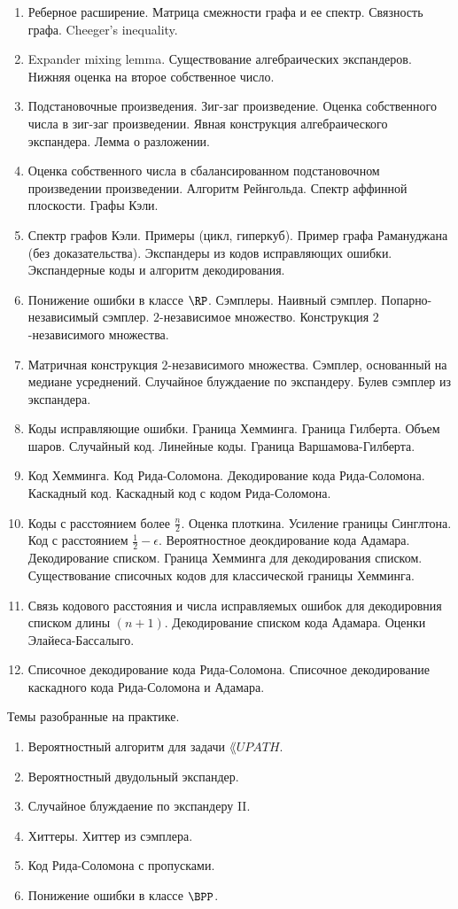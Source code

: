 \begin{enumerate}
    \item Реберное расширение. Матрица смежности графа и ее спектр. Связность графа. Cheeger's inequality.
    \item Expander mixing lemma. Существование алгебраических экспандеров. Нижняя оценка на второе собственное число.
    \item Подстановочные произведения. Зиг-заг произведение. Оценка собственного числа в зиг-заг произведении. Явная
        конструкция алгебраического экспандера. Лемма о разложении. 
    \item Оценка собственного числа в сбалансированном подстановочном произведении произведении. Алгоритм Рейнгольда. Спектр
        аффинной плоскости. Графы Кэли.
    \item Спектр графов Кэли. Примеры (цикл, гиперкуб). Пример графа Рамануджана (без доказательства). Экспандеры из кодов
        исправляющих ошибки. Экспандерные коды и алгоритм декодирования.
    \item Понижение ошибки в классе $\RP$. Сэмплеры. Наивный сэмплер. Попарно-независимый сэмплер. $2$-независимое
        множество. Конструкция $2$-независимого множества.
    \item Матричная конструкция $2$-независимого множества. Сэмплер, основанный на медиане усреднений. Случайное блуждаение
        по экспандеру. Булев сэмплер из экспандера.
    \item Коды исправляющие ошибки. Граница Хемминга. Граница Гилберта. Объем шаров. Случайный код. Линейные коды. Граница
        Варшамова-Гилберта.
    \item Код Хемминга. Код Рида-Соломона. Декодирование кода Рида-Соломона. Каскадный код. Каскадный код с кодом
        Рида-Соломона.
    \item Коды с расстоянием более $\frac{n}{2}$. Оценка плоткина. Усиление границы Синглтона. Код с расстоянием $\frac{1}{2}
        - \epsilon$. Вероятностное деокдирование кода Адамара. Декодирование списком. Граница Хемминга для декодирования
        списком. Существование списочных кодов для классической границы Хемминга.
	\item Связь кодового расстояния и числа исправляемых ошибок для декодировния списком длины $(n + 1)$. Декодирование
        списком кода Адамара. Оценки Элайеса-Бассалыго.
    \item Списочное декодирование кода Рида-Соломона. Списочное декодирование каскадного кода Рида-Соломона и Адамара.
\end{enumerate}

\breakline

Темы разобранные на практике.
\begin{enumerate}
    \item Вероятностный алгоритм для задачи $\lang{UPATH}$.
    \item Вероятностный двудольный экспандер.
    \item Случайное блуждаение по экспандеру II.
    \item Хиттеры. Хиттер из сэмплера.
    \item Код Рида-Соломона с пропусками.
    \item Понижение ошибки в классе $\BPP$.
\end{enumerate}